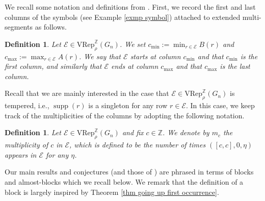 \documentclass[11pt,letterpaper]{amsart}
\newcommand{\Z}{\mathbb{Z}}
\newcommand{\VRep}{{\mathrm{VRep}}}
\newcommand{\EE}{\mathcal{E}}
\newtheorem{defn}[thm]{Definition}
\DeclareMathOperator{\supp}{supp}
\numberwithin{equation}{section}
\begin{document}
We recall some notation and definitions from \cite[\S3]{HKT26}. First, we record the first and last columns of the symbols (see Example \ref{exmp symbol}) attached to extended multi-segments as follows. 

\begin{defn}
\label{def-starts-ends}
    Let $\EE\in \VRep_\rho^\mathbb{Z}(G_n)$. We set $c_{\min} := \min_{r \in \EE} B(r)$ and $c_{\max} := \max_{r \in \EE} A(r)$. We say that $\EE$ \emph{starts at column} $c_{\min}$ and that $c_{\min}$ is the \emph{first column}, and similarly that $\EE$ \emph{ends at column} $c_{\max}$ and that $c_{\max}$ is the \emph{last column}. 
\end{defn}

Recall that we are mainly interested in the case that $\EE\in \VRep_\rho^\mathbb{Z}(G_n)$ is tempered, i.e., $\supp(r)$ is a singleton for any row $r\in\EE$. In this case, we keep track of the multiplicities of the columns by adopting the following notation.

\begin{defn}
\label{def-multiplicity}
    Let $\EE\in \VRep_\rho^\mathbb{Z}(G_n)$ and fix $c\in\Z$. We denote by $m_c$ the \emph{multiplicity of $c$ in $\EE$}, which is defined to be the number of times $([c,c], 0, \eta)$ appears in $\EE$ for any $\eta$.
\end{defn}

Our main results and conjectures (and those of \cite{HKT26}) are phrased in terms of blocks and almost-blocks which we recall below. We remark that the definition of a block is largely inspired by Theorem \ref{thm going up first occurrence}.
\end{document}
